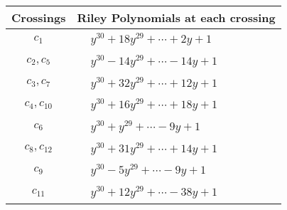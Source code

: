 \documentclass[1p]{elsarticle_modified}
\theoremstyle{definition}
\begin{document}
\begin{tabular}{m{50pt}|m{274pt}}
Crossings & \hspace{64pt}Riley Polynomials at each crossing \\
\hline $$\begin{aligned}c_{1}\end{aligned}$$&$\begin{aligned}
&y^{30}+18 y^{29}+\cdots+2 y+1
\end{aligned}$\\
\hline $$\begin{aligned}c_{2},c_{5}\end{aligned}$$&$\begin{aligned}
&y^{30}-14 y^{29}+\cdots-14 y+1
\end{aligned}$\\
\hline $$\begin{aligned}c_{3},c_{7}\end{aligned}$$&$\begin{aligned}
&y^{30}+32 y^{29}+\cdots+12 y+1
\end{aligned}$\\
\hline $$\begin{aligned}c_{4},c_{10}\end{aligned}$$&$\begin{aligned}
&y^{30}+16 y^{29}+\cdots+18 y+1
\end{aligned}$\\
\hline $$\begin{aligned}c_{6}\end{aligned}$$&$\begin{aligned}
&y^{30}+y^{29}+\cdots-9 y+1
\end{aligned}$\\
\hline $$\begin{aligned}c_{8},c_{12}\end{aligned}$$&$\begin{aligned}
&y^{30}+31 y^{29}+\cdots+14 y+1
\end{aligned}$\\
\hline $$\begin{aligned}c_{9}\end{aligned}$$&$\begin{aligned}
&y^{30}-5 y^{29}+\cdots-9 y+1
\end{aligned}$\\
\hline $$\begin{aligned}c_{11}\end{aligned}$$&$\begin{aligned}
&y^{30}+12 y^{29}+\cdots-38 y+1
\end{aligned}$\\
\hline
\end{tabular}\\~\\
\end{document}
